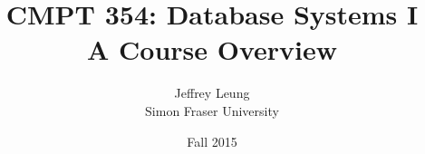 \documentclass[10pt, oneside, letterpaper, titlepage]{article}
\title{CMPT 354: Database Systems I \\\medskip \Large A Course Overview}
\author{Jeffrey Leung \\ Simon Fraser University}
\date{Fall 2015}
\begin{document}
	\begin{comment}
	\maketitle
	\tableofcontents
	\clearpage
	\end{comment}
	
	
	
	
	
	
	
	
	
	
	
	
\end{document}
